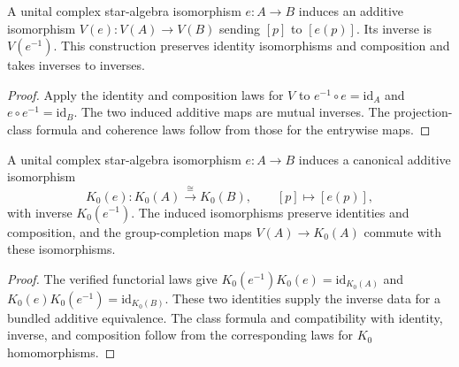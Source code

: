 \begin{proposition}\label{prop:stable-projection-isomorphism}
A unital complex star-algebra isomorphism $e:A\to B$ induces an additive
isomorphism $V(e):V(A)\to V(B)$ sending $[p]$ to $[e(p)]$.
Its inverse is $V(e^{-1})$. This construction preserves identity
isomorphisms and composition and takes inverses to inverses.
\end{proposition}
\begin{proof}
\leanok
Apply the identity and composition laws for $V$ to $e^{-1}\circ e=\mathrm{id}_A$
and $e\circ e^{-1}=\mathrm{id}_B$. The two induced additive maps are mutual
inverses. The projection-class formula and coherence laws follow from those
for the entrywise maps.
\end{proof}

\begin{proposition}\label{prop:unital-k0-isomorphism}
A unital complex star-algebra isomorphism $e:A\to B$ induces a canonical
additive isomorphism
\[
 K_0(e):K_0(A)\xrightarrow{\;\cong\;}K_0(B),\qquad [p]\longmapsto[e(p)],
\]
with inverse $K_0(e^{-1})$. The induced isomorphisms preserve identities
and composition, and the group-completion maps $V(A)\to K_0(A)$ commute
with these isomorphisms.
\end{proposition}
\begin{proof}
\leanok
The verified functorial laws give
$K_0(e^{-1})K_0(e)=\mathrm{id}_{K_0(A)}$ and
$K_0(e)K_0(e^{-1})=\mathrm{id}_{K_0(B)}$.
These two identities supply the inverse data for a bundled additive equivalence.
The class formula and compatibility with identity, inverse, and composition
follow from the corresponding laws for $K_0$ homomorphisms.
\end{proof}

